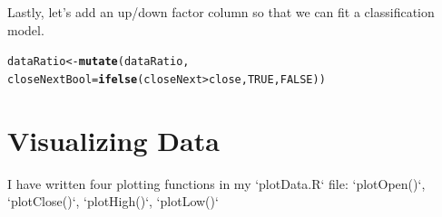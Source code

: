 \documentclass{article}\usepackage[]{graphicx}\usepackage[]{color}
\makeatletter
\newcommand{\hlnum}[1]{\textcolor[rgb]{0.686,0.059,0.569}{#1}}%
\newcommand{\hlopt}[1]{\textcolor[rgb]{0,0,0}{#1}}%
\newcommand{\hlstd}[1]{\textcolor[rgb]{0.345,0.345,0.345}{#1}}%
\newcommand{\hlkwb}[1]{\textcolor[rgb]{0.69,0.353,0.396}{#1}}%
\newcommand{\hlkwc}[1]{\textcolor[rgb]{0.333,0.667,0.333}{#1}}%
\newcommand{\hlkwd}[1]{\textcolor[rgb]{0.737,0.353,0.396}{\textbf{#1}}}%
\newenvironment{kframe}{%
 \def\at@end@of@kframe{}%
 \ifinner\ifhmode%
  \def\at@end@of@kframe{\end{minipage}}%
  \begin{minipage}{\columnwidth}%
 \fi\fi%
 \def\FrameCommand##1{\hskip\@totalleftmargin \hskip-\fboxsep
 \colorbox{shadecolor}{##1}\hskip-\fboxsep
     \hskip-\linewidth \hskip-\@totalleftmargin \hskip\columnwidth}%
 \MakeFramed {\advance\hsize-\width
   \@totalleftmargin\z@ \linewidth\hsize
   \@setminipage}}%
 {\par\unskip\endMakeFramed%
 \at@end@of@kframe}
\newenvironment{knitrout}{}{} %
\makeatother
\begin{document}
Lastly, let's add an up/down factor column so that we can fit a classification model.
\begin{knitrout}
\color{fgcolor}\begin{kframe}
\begin{alltt}
\hlstd{dataRatio} \hlkwb{<-} \hlkwd{mutate}\hlstd{(dataRatio,}
              \hlkwc{closeNextBool}\hlstd{=}\hlkwd{ifelse}\hlstd{(closeNext}\hlopt{>}\hlstd{close,}\hlnum{TRUE}\hlstd{,}\hlnum{FALSE}\hlstd{))}
\end{alltt}
\end{kframe}
\end{knitrout}

\section{Visualizing Data}
I have written four plotting functions in my `plotData.R` file:
`plotOpen()`, `plotClose()`, `plotHigh()`, `plotLow()`





\begin{figure}[ht]
\begin{center}
\qquad
{}%
\end{center}
\end{figure}
\end{document}
